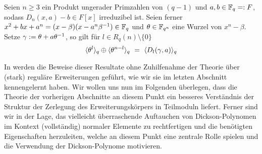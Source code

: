 \begin{satz}[{\autocite[Theorem 3]{scheerhorn:1997}}] 
  \label{satz:scheerhorn2}
  Seien $n\geq 3$ ein Produkt ungerader Primzahlen von $(q-1)$ und
  $a,b \in \mathbb{F}_q =: F$, sodass $D_n(x,a)-b\in F[x]$ irreduzibel ist.
  Seien ferner $x^2+bx +a^n = (x-\beta)(x-a^n\beta^{-1}) \in \mathbb{F}_q$ und
  $\theta \in \mathbb{F}_{q^n}$ eine Wurzel von $x^n-\beta$. Setze 
  $\gamma := \theta + a\theta^{-1}$, so gilt für 
  $l\in R_q(n) \setminus\{0\}$
  \[ \langle \theta^l\rangle_q \oplus \langle \theta^{n-l}\rangle_q
  \ =\  \langle D_l(\gamma,a)\rangle_q\]
\end{satz}

In \autocites{scheerhorn:1996}{scheerhorn:1997} werden die Beweise dieser
Resultate ohne Zuhilfenahme der Theorie über (stark) reguläre
Erweiterungen geführt, wie wir sie im letzten Abschnitt kennengelernt haben.
Wir wollen uns nun im Folgenden überlegen, dass die Theorie der vorherigen
Abschnitte an diesem Punkt ein besseres Verständnis der Struktur der Zerlegung 
des Erweiterungskörpers in Teilmoduln liefert. Ferner sind wir in der Lage,
das vielleicht überraschende Auftauchen von Dickson-Polynomen im Kontext
(vollständig) normaler Elemente zu rechtfertigen und die benötigten 
Eigenschaften herzuleiten, welche an diesem Punkt eine zentrale Rolle spielen
und die Verwendung der Dickson-Polynome motivieren.

